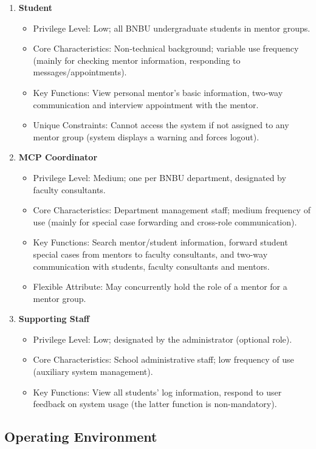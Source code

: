 \begin{enumerate}
\item \textbf{Student}
\begin{itemize}
\item Privilege Level: Low; all BNBU undergraduate students in mentor groups.
\item Core Characteristics: Non-technical background; variable use frequency (mainly for checking mentor information, responding to messages/appointments).
\item Key Functions: View personal mentor's basic information, two-way communication and interview appointment with the mentor.
\item Unique Constraints: Cannot access the system if not assigned to any mentor group (system displays a warning and forces logout).
\end{itemize}

\item \textbf{MCP Coordinator}
\begin{itemize}
\item Privilege Level: Medium; one per BNBU department, designated by faculty consultants.
\item Core Characteristics: Department management staff; medium frequency of use (mainly for special case forwarding and cross-role communication).
\item Key Functions: Search mentor/student information, forward student special cases from mentors to faculty consultants, and two-way communication with students, faculty consultants and mentors.
\item Flexible Attribute: May concurrently hold the role of a mentor for a mentor group.
\end{itemize}

\item \textbf{Supporting Staff}
\begin{itemize}
\item Privilege Level: Low; designated by the administrator (optional role).
\item Core Characteristics: School administrative staff; low frequency of use (auxiliary system management).
\item Key Functions: View all students' log information, respond to user feedback on system usage (the latter function is non-mandatory).
\end{itemize}
\end{enumerate}

\subsection{Operating Environment}

